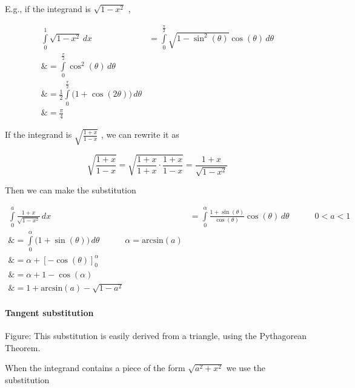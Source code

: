 E.g., if the integrand is $\sqrt{1-x^2}$ ,



\begin{align}
\int\limits _0^1\sqrt{1-x^2}\,dx &= \int\limits _0^\frac{\pi}{2}\sqrt{1-\sin^2(\theta)}\cos(\theta)\,d\theta \\\&= \int\limits _0^\frac{\pi}{2}\cos^2(\theta)\,d\theta \\\&= \tfrac{1}{2}\int\limits _0^\frac{\pi}{2}\bigl(1+\cos(2\theta)\bigr)\,d\theta \\\&= \frac{\pi}{4}
\end{align}





If the integrand is $\sqrt{\frac{1+x}{1-x}}$ , we can rewrite it as



$$\sqrt{\frac{1+x}{1-x}}=\sqrt{\frac{1+x}{1+x}\cdot\frac{1+x}{1-x}}=\frac{1+x}{\sqrt{1-x^2}}$$

Then we can make the substitution



\begin{align}
\int\limits _0^a\frac{1+x}{\sqrt{1-x^2}}\,dx 

&= \int\limits _0^\alpha\frac{1+\sin(\theta)}{\cos(\theta)}\cos(\theta)\,d\theta \quad\quad\quad 0 < a < 1 \\\&= \int\limits _0^\alpha\bigl(1+\sin(\theta)\bigr)\,d\theta \quad\quad\quad \alpha = \text{arcsin}(a) \\\&= \alpha + \left[-\cos(\theta)\right] _0^\alpha \\\&= \alpha + 1 - \cos(\alpha) \\\&= 1 + \text{arcsin}(a) - \sqrt{1-a^2}
\end{align}





\paragraph{Tangent substitution}






Figure: This substitution is easily derived from a triangle, using the Pythagorean Theorem.



When the integrand contains a piece of the form $\sqrt{a^2+x^2}$ we use the substitution



